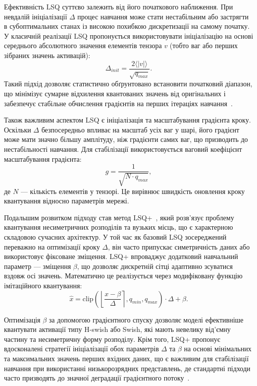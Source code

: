 \documentclass{pma-mthesis}
\begin{document}
Ефективність LSQ суттєво залежить від його початкового наближення. При невдалій ініціалізації $\Delta$ процес навчання може стати нестабільним або застрягти в субоптимальних станах із високою похибкою дискретизації на самому початку. У класичній реалізації LSQ пропонується використовувати ініціалізацію на основі середнього абсолютного значення елементів тензора $v$ (тобто ваг або перших зібраних значень активацій):
\begin{equation}
    \Delta_{init} = \frac{2 \langle |v| \rangle}{\sqrt{q_{max}}}.
\end{equation}
Такий підхід дозволяє статистично обґрунтовано встановити початковий діапазон, що мінімізує сумарне відхилення квантованих значень від оригінальних і забезпечує стабільне обчислення градієнтів на перших ітераціях навчання~\cite{Esser2020LSQ}.

Також важливим аспектом LSQ є ініціалізація та масштабування градієнта кроку. Оскільки $\Delta$ безпосередньо впливає на масштаб усіх ваг у шарі, його градієнт може мати значно більшу амплітуду, ніж градієнти самих ваг, що призводить до нестабільності навчання. Для стабілізації використовується ваговий коефіцієнт масштабування градієнта:
\begin{equation}
    g = \frac{1}{\sqrt{N \cdot q_{max}}},
\end{equation}
де $N$ --- кількість елементів у тензорі. Це вирівнює швидкість оновлення кроку квантування відносно параметрів мережі.

Подальшим розвитком підходу став метод LSQ+~\cite{bhalgat2020lsq+}, який розв’язує проблему квантування несиметричних розподілів та вузьких місць, що є характерною складовою сучасних архітектур. У той час як базовий LSQ зосереджений переважно на оптимізації кроку $\Delta$, він часто припускає симетричність даних або використовує фіксоване зміщення. LSQ+ впроваджує додатковий навчальний параметр --- зміщення $\beta$, що дозволяє дискретній сітці адаптивно зсуватися вздовж осі значень. Математично це реалізується через модифіковану функцію імітаційного квантування:
\begin{equation}
    \hat{x} = \text{clip} \left( \left\lfloor \frac{x - \beta}{\Delta} \right\rceil, q_{min}, q_{max} \right) \cdot \Delta + \beta.
\end{equation}

Оптимізація $\beta$ за допомогою градієнтного спуску дозволяє моделі ефективніше квантувати активації типу H-swish або Swish, які мають невелику від’ємну частину та несиметричну форму розподілу. Крім того, LSQ+ пропонує вдосконалені стратегії ініціалізації обох параметрів $\Delta$ та $\beta$ на основі мінімальних та максимальних значень перших вхідних даних, що є важливим для стабілізації навчання при використанні низькорозрядних представлень, де стандартні підходи часто призводять до значної деградації градієнтного потоку~\cite{bhalgat2020lsq+}.
\end{document}
